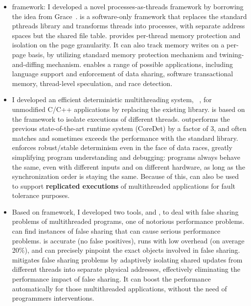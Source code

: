 \begin{itemize}
\item \Sheriff{} framework: I developed a novel processes-as-threads framework by borrowing the idea from Grace~\cite{grace}. \sheriff{} is a software-only framework that replaces the standard pthreads library and transforms
threads into processes, with separate address spaces but the shared file table. \sheriff{} provides per-thread memory protection and isolation on the page granularity. It can also track memory writes on a per-page basis, by utilizing standard memory protection mechanism and  twining-and-diffing mechanism. \sheriff{} enables a range of possible applications, including language support and enforcement of data sharing, software transactional memory, thread-level speculation, and race detection. 

\item I developed an efficient deterministic multithreading system, \dthreads{}~\cite{dthreads}, for unmodified C/C++ applications by replacing the existing \pthreads{} library. \dthreads{} is based on the \sheriff{} framework to isolate executions of different threads. \dthreads{} outperforms the previous state-of-the-art runtime system (CoreDet) by a factor of 3, and often matches and sometimes exceeds the performance with the standard \pthreads{} library. \Dthreads{} enforces robust/stable determinism even in the face of data races, greatly simplifying program understanding and debugging: programs always behave the same, even with different inputs and on different hardware, as long as the synchronization order is staying the same. Because of this, \dthreads{} can also be used to support \textbf{replicated executions} 
of multithreaded applications for fault tolerance purposes.

\item 
Based on \sheriff{} framework, I developed two tools, \SheriffDetect{} and \SheriffProtect{}, to deal with false sharing problems
of multithreaded programs, one of notorious performance problems. 
\SheriffDetect{} can find instances of false sharing that can cause serious performance problems. \SheriffDetect{} is accurate (no false positives), runs with low overhead (on average 20\%), and can precisely pinpoint the exact objects involved in false sharing.
\SheriffProtect{} mitigates false sharing problems by adaptively isolating shared 
updates from different threads into separate physical addresses, effectively 
eliminating the performance impact of false sharing. It can boost the performance automatically for those multithreaded applications, without the need of programmers interventions. 


\end{itemize}
